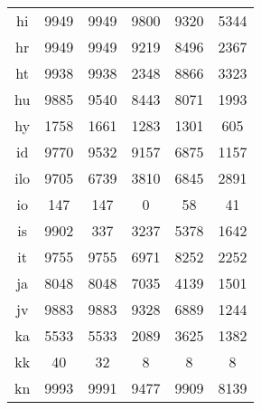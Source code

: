 \begin{figure}[h]
\begin{tabular}{cccccc}
hi&9949&9949&9800&9320&5344\\
hr&9949&9949&9219&8496&2367\\
ht&9938&9938&2348&8866&3323\\
hu&9885&9540&8443&8071&1993\\
hy&1758&1661&1283&1301&605\\
id&9770&9532&9157&6875&1157\\
ilo&9705&6739&3810&6845&2891\\
io&147&147&0&58&41\\
is&9902&337&3237&5378&1642\\
it&9755&9755&6971&8252&2252\\
ja&8048&8048&7035&4139&1501\\
jv&9883&9883&9328&6889&1244\\
ka&5533&5533&2089&3625&1382\\
kk&40&32&8&8&8\\
kn&9993&9991&9477&9909&8139\\
\end{tabular}
\end{figure}
\clearpage
